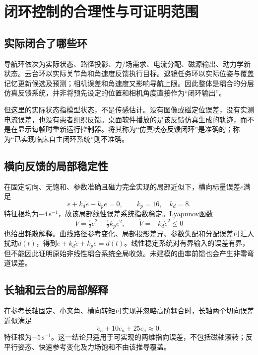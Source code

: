 \documentclass[UTF8,a4paper,zihao=5,fontset=windows]{ctexart}
\newcommand{\unit}[1]{\,\mathrm{#1}}
\begin{document}
\section{闭环控制的合理性与可证明范围}
\subsection{实际闭合了哪些环}
导航环依次为实际状态、路径投影、力/场需求、电流分配、磁源输出、动力学新状态。云台环以实际关节角和角速度反馈执行目标。退镜任务环以实际位姿与覆盖记忆更新候选及预测；相机误差和角速度又影响导航上限。因此整体是耦合的分层仿真反馈系统，并非将预先设定的位置和相机角度直接作为“闭环输出”。

但这里的实际状态指模型状态，不是传感估计。没有图像或磁定位误差，没有实测电流误差，也没有患者组织反馈。桌面软件播放的是该反馈仿真生成的轨迹，而不是在显示每帧时重新运行控制器。将其称为“仿真状态反馈闭环”是准确的；称为“已实现临床自主闭环系统”则不准确。

\subsection{横向反馈的局部稳定性}
在固定切向、无饱和、参数准确且磁力完全实现的局部近似下，横向标量误差$e$满足
\begin{equation}
\ddot e+k_d\dot e+k_pe=0,\qquad k_p=16,\quad k_d=8.
\label{eq:lateral_stability}
\end{equation}
特征根均为$-4\unit{s^{-1}}$，故该局部线性误差系统指数稳定。Lyapunov函数
\begin{equation}
V=\tfrac12\dot e^2+\tfrac12k_pe^2,\qquad \dot V=-k_d\dot e^2\le0
\label{eq:lyapunov}
\end{equation}
也给出耗散解释。曲线路径参考变化、局部投影差异、参数失配和分配误差可汇入扰动$d(t)$，得到$\ddot e+k_d\dot e+k_pe=d(t)$。线性稳定系统对有界输入的误差有界，但不能因此证明原始非线性耦合系统全局收敛。未建模的曲率前馈也会产生非零弯道误差。

\subsection{长轴和云台的局部解释}
在参考长轴固定、小夹角、横向转矩可实现并忽略高阶耦合时，长轴两个切向误差近似满足
\begin{equation}
\ddot e_a+10\dot e_a+25e_a\approx0.
\end{equation}
特征根为$-5\unit{s^{-1}}$。这一结论只适用于可实现的两维指向误差，不包括磁轴滚转；反平行姿态、快速参考变化及力场饱和不由该推导覆盖。
\end{document}
